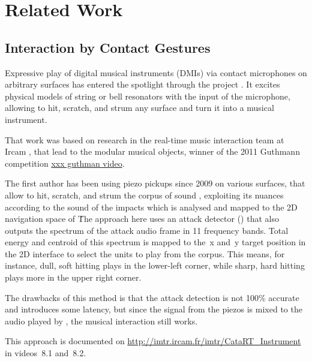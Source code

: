 \section{Related Work}


\subsection{Interaction by Contact Gestures}


Expressive play of digital musical instruments (DMIs) via contact microphones on arbitrary surfaces has entered the spotlight through the  project  \cite{Zamborlin14a}.  It excites physical models of string or bell resonators with the input of the microphone, allowing to hit, scratch, and strum any surface and turn it into a musical instrument.  


That work was based on research in the real-time music interaction team at Ircam \cite{Rasamimanana11a,Bevilacqua11b,Zamborlin14a}, that lead to the  modular musical objects, winner of the 2011 Guthmann competition \url{xxx guthman video}.


The first author has been using piezo pickups since 2009 on various surfaces, that allow to hit, scratch, and strum the corpus of sound \cite{Schwarz-nime2012-sound-space}, exploiting
its nuances according to the sound of the impacts which is analysed and mapped to
the 2D navigation space of \catart\.


The approach here uses an attack detector () that also outputs the spectrum of the
attack audio frame in 11 frequency bands.  Total energy and centroid of this spectrum is mapped to
the~x and~y target position in the 2D interface to select the units to play from the corpus.
This means, for instance, dull, soft hitting plays in the lower-left corner, while sharp, hard hitting plays more in the upper right corner.


The drawbacks of this method is that the attack detection is not 100\% accurate and introduces some latency, but since the signal from the piezos is mixed to the
audio played by \catart, the musical interaction still works.


This approach is documented on \url{http://imtr.ircam.fr/imtr/CataRT_Instrument} in videos~8.1 and~8.2.


\subsection{\CBCS}


